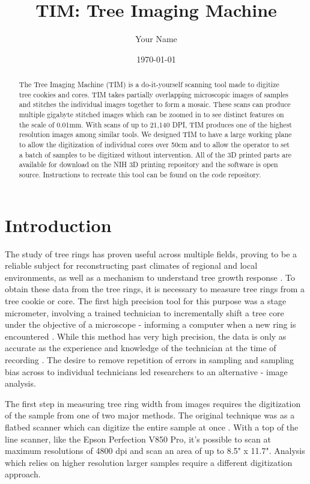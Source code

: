 \documentclass[a4paper,12pt]{article}
\title{TIM: Tree Imaging Machine}
\author{Your Name}
\date{\today}
\begin{document}
\maketitle

\begin{abstract}
The Tree Imaging Machine (TIM) is a do-it-yourself scanning tool made to digitize tree cookies and cores. TIM takes partially overlapping microscopic images of samples and stitches the individual images together to form 
a mosaic. These scans can produce multiple gigabyte stitched images which can be zoomed in to see distinct features on the scale of 0.01mm. With scans of up to 21,140 DPI, TIM produces one of the highest resolution images among similar tools.
We designed TIM to have a large working plane to allow the digitization of individual cores over 50cm and to allow the operator to set a batch of samples to be digitized without intervention. 
All of the 3D printed parts are available for download on the NIH 3D printing repository and the software is 
open source. Instructions to recreate this tool can be found on the code repository. 
\end{abstract}

\section{Introduction}
The study of tree rings has proven useful across multiple fields, proving to be a reliable subject for reconstructing past climates of regional and local environments, as well as a mechanism to understand tree growth response \citep{fritts_dendroclimatology_1971} \citep{williams_using_2010} \citep{guibal_dendrochronology_2021} \citep{sheppard_dendroclimatology_2010}.
To obtain these data from the tree rings, it is necessary to measure tree rings from a tree cookie or core. The first high precision tool for this purpose was a stage micrometer, involving a trained technician to incrementally shift a tree core under the objective of a microscope - informing a computer when a new ring is encountered \citep{robinson_microcomputer_nodate}.
While this method has very high precision, the data is only as accurate as the experience and knowledge of the technician at the time of recording \citep{levanic_atrics_2007}.
The desire to remove repetition of errors in sampling and sampling bias across to individual technicians led researchers to an alternative - image analysis. 

The first step in measuring tree ring width from images requires the digitization of the sample from one of two major methods.  
The original technique was as a flatbed scanner which can digitize the entire sample at once \citep{guay_new_1992}. 
With a top of the line scanner, like the Epson Perfection V850 Pro, it's possible to scan at maximum resolutions of 4800 dpi and scan an area of up to 8.5" x 11.7".
Analysis which relies on higher resolution larger samples require a different digitization approach. 
\end{document}
